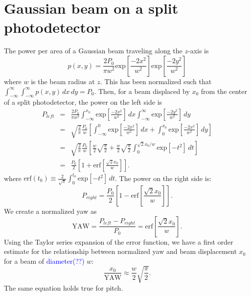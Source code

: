 \section{Gaussian beam on a split photodetector}
\label{app:beamonQPD}
The power per area of a Gaussian beam traveling along the $z$-axis is 
\begin{equation}
p(x,y) = \frac{2 P_0}{\pi w^2} \mbox{exp}\left[\frac{-2x^2}{w^2}\right] \mbox{exp}\left[\frac{-2y^2}{w^2}\right]
\end{equation}
where $w$ is the beam radius at $z$.  This has been normalized such
that $\int_{-\infty}^\infty \int_{-\infty}^\infty p(x,y) \,dx \,dy =
P_0$. Then, for a beam displaced by $x_0$ from the center of a split
photodetector, the power on the left side is
\begin{eqnarray} 
P_{left} &=& \frac{2 P_0}{\pi w^2} \int_{-\infty}^{x_0} \mbox{exp}\left[\frac{-2x^2}{w^2}\right]  \,dx \int_{-\infty}^\infty \mbox{exp}\left[\frac{-2y^2}{w^2}\right] \,dy \\
&=& \sqrt{\frac{2}{\pi}} \frac{P_0}{w} \left[ \int_{-\infty}^{0} \mbox{exp}\left[\frac{-2x^2}{w^2}\right]  \,dx + \int_0^{x_0} \mbox{exp}\left[\frac{-2x^2}{w^2}\right] \,dy \right] \\
&=& \sqrt{\frac{2}{\pi}} \frac{P_0}{w} \left[ \frac{w}{2} \sqrt{\frac{\pi}{2}} + \frac{w}{2} \sqrt{\frac{\pi}{2}} \int_0^{\sqrt{2} x_0 / w} \mbox{exp}\left[-t^2 \right] \,dt  \right] \\
&=& \frac{P_0}{2} \left[1 + \mbox{erf}\left[ \frac{\sqrt{2} x_0}{w} \right] \right].
\end{eqnarray}
where $\mathrm{erf}(t_0) \equiv \frac{2}{\sqrt{\pi}} \int_0^{t_0}
\mbox{exp}\left[-t^2 \right] \,dt$. The power on the right side is:
\begin{equation}
P_{right} = \frac{P_0}{2} \left[1 - \mbox{erf}\left[ \frac{\sqrt{2} x_0}{w} \right] \right].
\end{equation}
We create a normalized yaw as
\begin{equation}
\mathrm{YAW} = \frac{P_{left} - P_{right}}{P_0} = \mathrm{erf}\left[ \frac{\sqrt{2} x_0}{w} \right].
\end{equation}
Using the Taylor series expansion of the error function, we have a
first order estimate for the relationship between normalized yaw and
beam displacement $x_0$ for a beam of \textcolor{blue}{diameter(??)} $w$:
\begin{equation}
\frac{x_0}{\mathrm{YAW}} \approx \frac{w}{2} \sqrt{\frac{\pi}{2}}.
\end{equation}
The same equation holds true for pitch.




